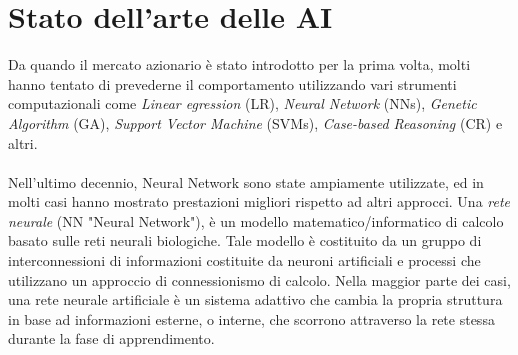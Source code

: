 \documentclass[a4paper,12pt]{report}
\begin{document}
\section{Stato dell'arte delle AI}
Da quando il mercato azionario è stato introdotto per la prima volta, molti hanno tentato di prevederne il comportamento utilizzando vari strumenti computazionali come \textit{Linear egression} (LR), \textit{Neural Network} (NNs), \textit{Genetic Algorithm} (GA), \textit{Support Vector Machine} (SVMs), \textit{Case-based Reasoning} (CR) e altri.\\~\\
Nell'ultimo decennio, Neural Network sono state ampiamente utilizzate, ed in molti casi hanno mostrato prestazioni migliori rispetto ad altri approcci. Una \textit{rete neurale} (NN "Neural Network"), è un modello matematico/informatico di calcolo basato sulle reti neurali biologiche. Tale modello è costituito da un gruppo di interconnessioni di informazioni costituite da neuroni artificiali e processi che utilizzano un approccio di connessionismo di calcolo. Nella maggior parte dei casi, una rete neurale artificiale è un sistema adattivo che cambia la propria struttura in base ad informazioni esterne, o interne, che scorrono attraverso la rete stessa durante la fase di apprendimento.\\~\\
\end{document}
